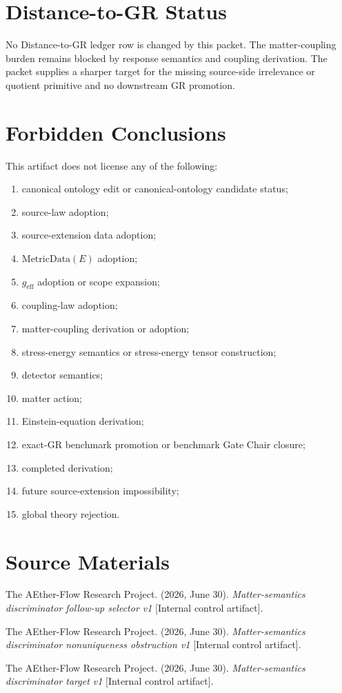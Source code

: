\section{Distance-to-GR Status}

No Distance-to-GR ledger row is changed by this packet.  The matter-coupling
burden remains blocked by response semantics and coupling derivation.  The
packet supplies a sharper target for the missing source-side irrelevance or
quotient primitive and no downstream GR promotion.

\section{Forbidden Conclusions}

This artifact does not license any of the following:
\begin{enumerate}
  \item canonical ontology edit or canonical-ontology candidate status;
  \item source-law adoption;
  \item source-extension data adoption;
  \item \(\mathrm{MetricData}(E)\) adoption;
  \item \(g_{\mathrm{eff}}\) adoption or scope expansion;
  \item coupling-law adoption;
  \item matter-coupling derivation or adoption;
  \item stress-energy semantics or stress-energy tensor construction;
  \item detector semantics;
  \item matter action;
  \item Einstein-equation derivation;
  \item exact-GR benchmark promotion or benchmark Gate Chair closure;
  \item completed derivation;
  \item future source-extension impossibility;
  \item global theory rejection.
\end{enumerate}

\section{Source Materials}

The AEther-Flow Research Project. (2026, June 30). \emph{Matter-semantics
discriminator follow-up selector v1} [Internal control artifact].

The AEther-Flow Research Project. (2026, June 30). \emph{Matter-semantics
discriminator nonuniqueness obstruction v1} [Internal control artifact].

The AEther-Flow Research Project. (2026, June 30). \emph{Matter-semantics
discriminator target v1} [Internal control artifact].

